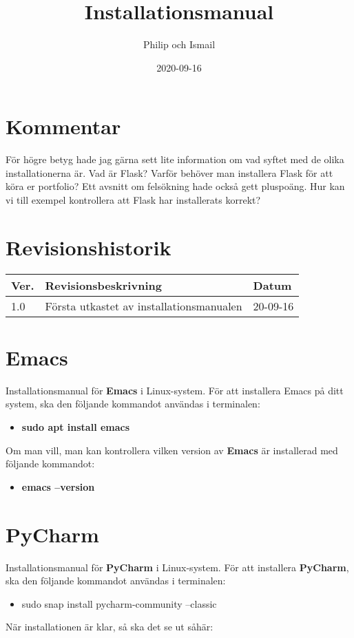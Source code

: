 \documentclass{TDP003mall}
\author{Philip och Ismail}
\title{Installationsmanual}
\date{2020-09-16}
\begin{document}
\projectpage
\section{Kommentar}
För högre betyg hade jag gärna sett lite information om vad syftet med de olika installationerna är. Vad är Flask? Varför behöver man installera Flask för att köra er portfolio? Ett avsnitt om felsökning hade också gett pluspoäng. Hur kan vi till exempel kontrollera att Flask har installerats korrekt?

\section{Revisionshistorik}
\begin{table}[!h]
\begin{tabularx}{\linewidth}{|l|X|l|}
\hline
Ver. & Revisionsbeskrivning & Datum \\\hline
1.0 & Första utkastet av installationsmanualen & 20-09-16 \\\hline
\end{tabularx}
\end{table}

\section{Emacs}
Installationsmanual för \textbf{Emacs} i Linux-system.
För att installera Emacs på ditt system, ska den följande kommandot användas i terminalen:
\begin{itemize}  
\item
 \textbf{sudo apt install emacs}
\end{itemize}
Om man vill, man kan kontrollera vilken version av \textbf{Emacs} är installerad med följande kommandot:
\begin{itemize}
\item
  \textbf{emacs --version}
\end{itemize}

\section{PyCharm}
Installationsmanual för \textbf{PyCharm} i Linux-system.
För att installera \textbf{PyCharm}, ska den följande kommandot användas i terminalen:
\begin{itemize}
\item
sudo snap install pycharm-community --classic
\end{itemize}
När installationen är klar, så ska det se ut såhär:
\end{document}
